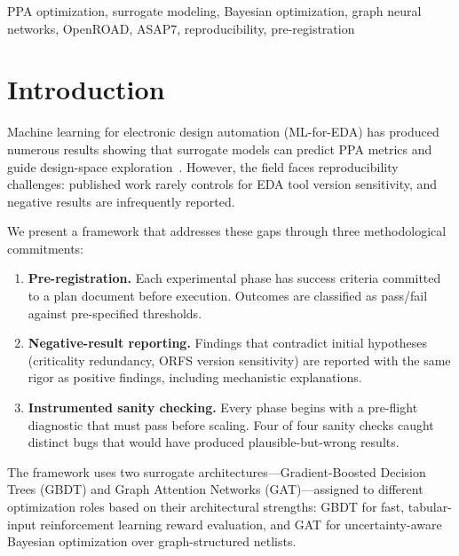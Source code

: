 \documentclass[conference]{IEEEtran}
\begin{document}
\begin{IEEEkeywords}
PPA optimization, surrogate modeling, Bayesian optimization, graph neural networks,
OpenROAD, ASAP7, reproducibility, pre-registration
\end{IEEEkeywords}

\section{Introduction}

Machine learning for electronic design automation (ML-for-EDA) has produced numerous
results showing that surrogate models can predict PPA metrics and guide design-space
exploration~\cite{kahng2021,openroad2019,cheng2021}. However, the field faces
reproducibility challenges: published work rarely controls for EDA tool version
sensitivity, and negative results are infrequently reported.

We present a framework that addresses these gaps through three methodological
commitments:

\begin{enumerate}
\item \textbf{Pre-registration.} Each experimental phase has success criteria committed
to a plan document before execution. Outcomes are classified as pass/fail against
pre-specified thresholds.

\item \textbf{Negative-result reporting.} Findings that contradict initial hypotheses
(criticality redundancy, ORFS version sensitivity) are reported with the same rigor
as positive findings, including mechanistic explanations.

\item \textbf{Instrumented sanity checking.} Every phase begins with a pre-flight
diagnostic that must pass before scaling. Four of four sanity checks caught distinct
bugs that would have produced plausible-but-wrong results.
\end{enumerate}

The framework uses two surrogate architectures—Gradient-Boosted Decision Trees (GBDT)
and Graph Attention Networks (GAT)—assigned to different optimization roles based on
their architectural strengths: GBDT for fast, tabular-input reinforcement learning
reward evaluation, and GAT for uncertainty-aware Bayesian optimization over
graph-structured netlists.
\end{document}
